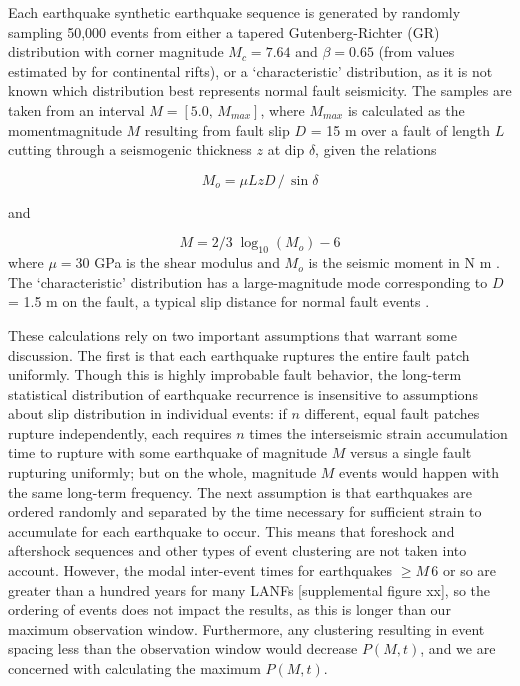 \documentclass[twocolumn,grl]{AGUTeX}
\begin{document}
\begin{article}
Each earthquake synthetic earthquake sequence is generated by
randomly sampling 50,000 events from either a tapered Gutenberg-Richter (GR)
distribution with corner magnitude $M_c = 7.64$ and $\beta = 0.65$
(from values estimated by \citet{birdkagan2004f_m} for continental
rifts), or a `characteristic' distribution, as it is not known which
distribution best represents normal fault seismicity.  The samples are taken 
from an interval $M = [5.0, \, M_{max}]$, where $M_{max}$ is calculated as the momentmagnitude $M$ resulting from fault slip $D$ = 15 m over a fault of
length $L$ cutting through a seismogenic thickness $z$ at dip $\delta$,
given the relations

\begin{equation}
 M_o = \mu L z D \,/ \, \sin \delta 
 \end{equation}

and

\begin{equation}
M = 2/3 \; \log_{10} (M_o) - 6
\end{equation}
where $\mu = 30$ GPa is the shear modulus and $M_o$ is the seismic
moment in N m \citep{kagan2003pepi}.  The `characteristic' distribution has a
large-magnitude mode corresponding to $D$ = 1.5 m on the fault, a typical
slip distance for normal fault events \citep[e.g.][]{caskey1996}.

These calculations rely on two important assumptions that warrant some
discussion.  The first is that each earthquake ruptures the entire
fault patch uniformly.  Though this is highly improbable fault behavior,
the long-term statistical distribution of earthquake recurrence is 
insensitive to assumptions about slip distribution in
individual events: if $n$ different, equal fault patches rupture independently, each requires $n$ times the interseismic strain accumulation time to rupture with
some earthquake of magnitude $M$ versus a single fault rupturing uniformly; 
but on the whole, magnitude $M$ events would happen with the same long-term
frequency.  The next assumption is that earthquakes are ordered randomly and
separated by the time necessary for sufficient strain to accumulate for each
earthquake to occur.  This means that foreshock and aftershock sequences
and other types of event clustering are not taken into account.  However,
the modal inter-event times for earthquakes $\ge M \,6$ or so are greater than
a hundred years for many LANFs [supplemental figure xx], so the ordering of
events does not impact the results, as this is longer than our maximum observation window.  Furthermore, any clustering resulting in
event spacing less than the observation window would decrease $P(M,t)$, and
we are concerned with calculating the maximum $P(M,t)$.


\end{article}
\end{document}
